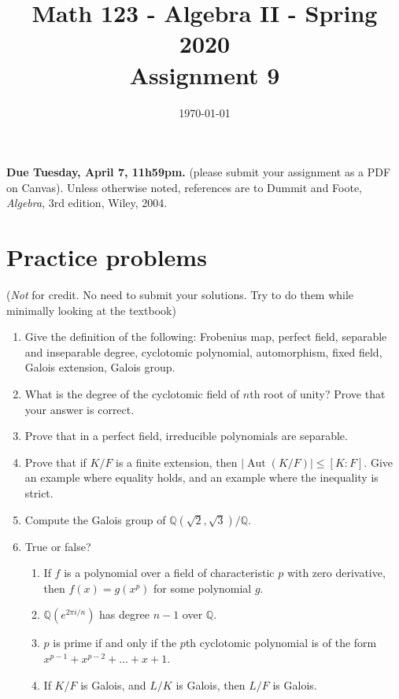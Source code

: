 \documentclass{amsart}
\title[Math 123, Spring 2020: assignment 9]{Math 123 - Algebra II - Spring 2020 \\ Assignment 9}
\date{\today}
\theoremstyle{definition}
\newcommand{\Qq}{\mathbb{Q}}
\newcommand{\Aut}{\operatorname{Aut}}
\begin{document}

\vspace*{-10em}
\maketitle

\textbf{Due Tuesday, April 7, 11h59pm.} (please submit your assignment as a PDF on Canvas). Unless otherwise noted, references are to Dummit and Foote, \emph{Algebra}, 3rd edition, Wiley, 2004.

\section*{Practice problems} (\emph{Not} for credit. No need to submit your solutions. Try to do them while minimally looking at the textbook)

\begin{enumerate}
\item Give the definition of the following: Frobenius map, perfect field, separable and inseparable degree, cyclotomic polynomial, automorphism, fixed field, Galois extension, Galois group. 
\item What is the degree of the cyclotomic field of $n$th root of unity? Prove that your answer is correct.
\item Prove that in a perfect field, irreducible polynomials are separable.
\item Prove that if $K / F$ is a finite extension, then $|\Aut (K / F)| \le [K : F]$. Give an example where equality holds, and an example where the inequality is strict.
\item Compute the Galois group of $\Qq (\sqrt{2}, \sqrt{3}) / \Qq$.
\item True or false?
  \begin{enumerate}
  \item If $f$ is a polynomial over a field of characteristic $p$ with zero derivative, then $f (x) = g (x^p)$ for some polynomial $g$.
  \item $\Qq (e^{2\pi i / n})$ has degree $n - 1$ over $\Qq$.
  \item $p$ is prime if and only if the $p$th cyclotomic polynomial is of the form $x^{p - 1} + x^{p - 2} + \ldots + x + 1$.
  \item If $K / F$ is Galois, and $L / K$ is Galois, then $L / F$ is Galois.
  \end{enumerate}
\end{enumerate}
\end{document}
